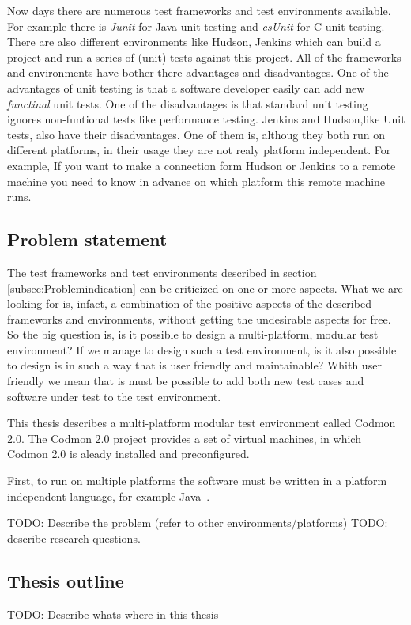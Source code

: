 \documentclass[a4paper,10pt]{scrartcl}
\newcommand{\project}{Codmon 2.0}
\newcommand{\CS}{C\nolinebreak\hspace{-.05em}\raisebox{.6ex}{\bf \#}}
\begin{document}
Now days there are numerous test frameworks and test environments available. For example there is \emph{Junit} for Java-unit testing and \emph{csUnit} for \CS{}-unit testing.
There are also different environments like Hudson, Jenkins which can build a project and run a series of (unit) tests against this project. All of the frameworks
and environments have bother there advantages and disadvantages. One of the advantages of unit testing is that a software developer easily can add new \emph{functinal} unit tests.
One of the disadvantages is that standard unit testing ignores non-funtional tests like performance testing. Jenkins and Hudson,like Unit tests, also have their
disadvantages. One of them is, althoug they both run on different platforms, in their usage they are not realy platform independent. For example, If you want
to make a connection form Hudson or Jenkins to a remote machine you need to know in advance on which platform this remote machine runs.


\subsection{Problem statement}
\label{subsec:Problemstatement}
The test frameworks and test environments described in section \ref{subsec:Problemindication} can be criticized on one or more aspects. What we are looking for is, infact, a combination
of the positive aspects of the described frameworks and environments, without getting the undesirable aspects for free. So the big question is, is it possible to design a
multi-platform, modular test environment? If we manage to design such a test environment, is it also possible to design is in such a way that is user friendly and maintainable?
Whith user friendly we mean that is must be possible to add both new test cases and software under test to the test environment.


 This thesis describes a multi-platform modular test environment called \project{}. The \project{} project provides a set of virtual machines,
in which \project{} is aleady installed and preconfigured.

First, to run on multiple platforms the software must be written in a
platform independent language, for example Java~\cite{Java}.


TODO: Describe the problem (refer to other environments/platforms)
TODO: describe research questions.

\subsection{Thesis outline}
\label{subsec:Thesisoutline}
TODO: Describe whats where in this thesis
\end{document}
